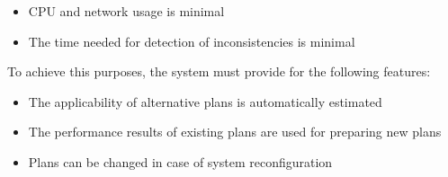 \begin{itemize}
    \item CPU and network usage is minimal
    \item The time needed for detection of inconsistencies is minimal
\end{itemize}

To achieve this purposes, the system must provide for the following features:

\begin{itemize}
    \item The applicability of alternative plans is automatically estimated
    \item The performance results of existing plans are used for preparing new plans
    \item Plans can be changed in case of system reconfiguration
\end{itemize}